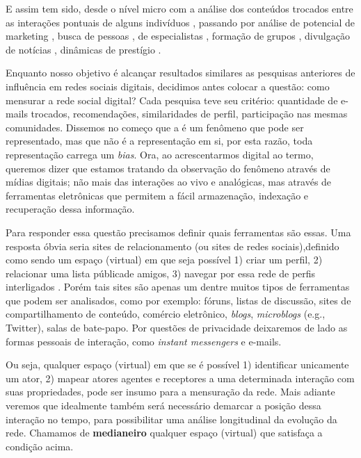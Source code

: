 \documentclass{article}
\begin{document}
E assim tem sido, desde o nível micro com a análise dos conteúdos trocados
entre as interações pontuais de alguns indivíduos \cite{Recuero2008}, passando
por análise de potencial de marketing
\cite{Clemons2007}\cite{Domingos2001}\cite{Richardson2002}\cite{Ma2008}, busca
de pessoas \cite{ADAMIC2005}, de especialistas \cite{Ehrlich2007}, formação de
grupos \cite{Adamic2003}\cite{Backstrom2006}\cite{Kumar2006}, divulgação de
notícias \cite{Gruhl2004}, dinâmicas de prestígio
\cite{Salganik2006}\cite{Song2007}.

Enquanto nosso objetivo é alcançar resultados similares as pesquisas anteriores
de influência em redes sociais digitais, decidimos antes colocar a questão: como
mensurar a rede social digital? Cada pesquisa teve seu critério: quantidade de
e-mails trocados, recomendações, similaridades de perfil, participação nas mesmas
comunidades. Dissemos no começo que a \observednet é um fenômeno que pode ser
representado, mas que não é a representação em si, por esta razão, toda
representação carrega um \textit{bias}. Ora, ao acrescentarmos digital ao termo,
queremos dizer que estamos tratando da observação do fenômeno através de mídias
digitais; não mais das interações ao vivo e analógicas, mas através de
ferramentas eletrônicas que permitem a fácil armazenação, indexação e recuperação
dessa informação.

Para responder essa questão precisamos definir quais ferramentas são essas. Uma
resposta óbvia seria sites de relacionamento (ou sites de redes sociais),definido
como sendo um espaço (virtual) em que seja possível 1) criar um perfil, 2)
relacionar uma lista públicade amigos, 3) navegar por essa rede de perfis
interligados \cite{Boyd2007}. Porém tais sites são apenas um dentre muitos tipos
de ferramentas que podem ser analisados, como por exemplo: fóruns, listas de
discussão, sites de compartilhamento de conteúdo, comércio eletrônico,
\textit{blogs}, \textit{microblogs} (e.g., Twitter), salas de bate-papo. Por
questões de privacidade deixaremos de lado as formas pessoais de interação, como
\textit{instant messengers} e e-mails.

Ou seja, qualquer espaço (virtual) em que se é possível 1) identificar
unicamente um ator, 2) mapear atores agentes e receptores a uma determinada
interação com suas propriedades, pode ser insumo para a mensuração da rede. Mais
adiante veremos que idealmente também será necessário demarcar a posição dessa
interação no tempo, para possibilitar uma análise longitudinal da evolução da
rede. Chamamos de \textbf{medianeiro} qualquer espaço (virtual) que satisfaça a
condição acima.
\end{document}
